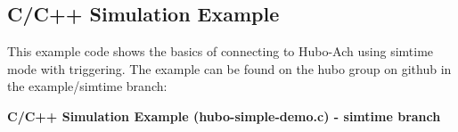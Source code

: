 \subsection{C/C++ Simulation Example}

This example code shows the basics of connecting to Hubo-Ach using simtime mode with triggering. The example can be found on the hubo group on github in the example/simtime branch:






\footnotesize
\noindent \textbf{C/C++ Simulation Example (hubo-simple-demo.c) - simtime branch}
\vspace{-6mm}

